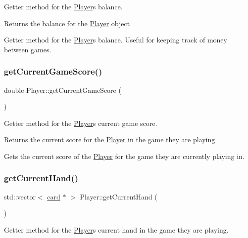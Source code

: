 Getter method for the \hyperlink{classPlayer}{Player}\textquotesingle{}s balance. 

\begin{DoxyReturn}{Returns}
the balance for the \hyperlink{classPlayer}{Player} object
\end{DoxyReturn}
Getter method for the \hyperlink{classPlayer}{Player}\textquotesingle{}s balance. Useful for keeping track of money between games. \mbox{\label{classPlayer_a0aade73735727e68e4f07734e76c875a}} 
\subsubsection{\texorpdfstring{get\+Current\+Game\+Score()}{getCurrentGameScore()}}
{\footnotesize\ttfamily double Player\+::get\+Current\+Game\+Score (\begin{DoxyParamCaption}{ }\end{DoxyParamCaption})}



Getter method for the \hyperlink{classPlayer}{Player}\textquotesingle{}s current game score. 

\begin{DoxyReturn}{Returns}
the current score for the \hyperlink{classPlayer}{Player} in the game they are playing
\end{DoxyReturn}
Gets the current score of the \hyperlink{classPlayer}{Player} for the game they are currently playing in. \mbox{\label{classPlayer_a5117d4863ff28cd0bf522cfe34995c27}} 
\subsubsection{\texorpdfstring{get\+Current\+Hand()}{getCurrentHand()}}
{\footnotesize\ttfamily std\+::vector$<$ \hyperlink{classcard}{card} $\ast$ $>$ Player\+::get\+Current\+Hand (\begin{DoxyParamCaption}{ }\end{DoxyParamCaption})}



Getter method for the \hyperlink{classPlayer}{Player}\textquotesingle{}s current hand in the game they are playing. 

